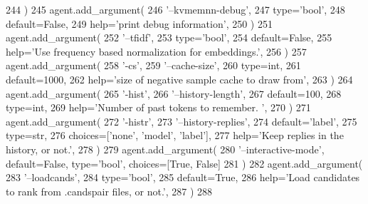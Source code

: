 \begin{DoxyCode}
244         )
245         agent.add\_argument(
246             \textcolor{stringliteral}{'--kvmemnn-debug'},
247             type=\textcolor{stringliteral}{'bool'},
248             default=\textcolor{keyword}{False},
249             help=\textcolor{stringliteral}{'print debug information'},
250         )
251         agent.add\_argument(
252             \textcolor{stringliteral}{'--tfidf'},
253             type=\textcolor{stringliteral}{'bool'},
254             default=\textcolor{keyword}{False},
255             help=\textcolor{stringliteral}{'Use frequency based normalization for embeddings.'},
256         )
257         agent.add\_argument(
258             \textcolor{stringliteral}{'-cs'},
259             \textcolor{stringliteral}{'--cache-size'},
260             type=int,
261             default=1000,
262             help=\textcolor{stringliteral}{'size of negative sample cache to draw from'},
263         )
264         agent.add\_argument(
265             \textcolor{stringliteral}{'-hist'},
266             \textcolor{stringliteral}{'--history-length'},
267             default=100,
268             type=int,
269             help=\textcolor{stringliteral}{'Number of past tokens to remember. '},
270         )
271         agent.add\_argument(
272             \textcolor{stringliteral}{'-histr'},
273             \textcolor{stringliteral}{'--history-replies'},
274             default=\textcolor{stringliteral}{'label'},
275             type=str,
276             choices=[\textcolor{stringliteral}{'none'}, \textcolor{stringliteral}{'model'}, \textcolor{stringliteral}{'label'}],
277             help=\textcolor{stringliteral}{'Keep replies in the history, or not.'},
278         )
279         agent.add\_argument(
280             \textcolor{stringliteral}{'--interactive-mode'}, default=\textcolor{keyword}{False}, type=\textcolor{stringliteral}{'bool'}, choices=[\textcolor{keyword}{True}, \textcolor{keyword}{False}]
281         )
282         agent.add\_argument(
283             \textcolor{stringliteral}{'--loadcands'},
284             type=\textcolor{stringliteral}{'bool'},
285             default=\textcolor{keyword}{True},
286             help=\textcolor{stringliteral}{'Load candidates to rank from .candspair files, or not.'},
287         )
288 
\end{DoxyCode}
\mbox{\label{classprojects_1_1personachat_1_1kvmemnn_1_1kvmemnn_1_1KvmemnnAgent_acdb68ad3ee78406e564655bfe27b2ef2}} 
